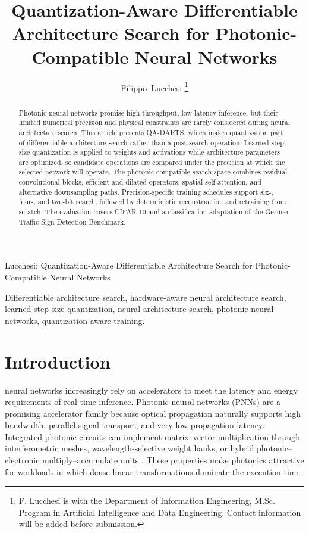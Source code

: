 \documentclass[lettersize,journal]{IEEEtran}
\begin{document}
\title{Quantization-Aware Differentiable Architecture Search for Photonic-Compatible Neural Networks}

\author{Filippo~Lucchesi%
\thanks{F. Lucchesi is with the Department of Information Engineering, M.Sc. Program in Artificial Intelligence and Data Engineering. Contact information will be added before submission.}%
}

%
{Lucchesi: Quantization-Aware Differentiable Architecture Search for Photonic-Compatible Neural Networks}

\maketitle

\begin{abstract}
Photonic neural networks promise high-throughput, low-latency inference, but their limited numerical precision and physical constraints are rarely considered during neural architecture search. This article presents QA-DARTS, which makes quantization part of differentiable architecture search rather than a post-search operation. Learned-step-size quantization is applied to weights and activations while architecture parameters are optimized, so candidate operations are compared under the precision at which the selected network will operate. The photonic-compatible search space combines residual convolutional blocks, efficient and dilated operators, spatial self-attention, and alternative downsampling paths. Precision-specific training schedules support six-, four-, and two-bit search, followed by deterministic reconstruction and retraining from scratch. The evaluation covers CIFAR-10 and a classification adaptation of the German Traffic Sign Detection Benchmark.
\end{abstract}

\begin{IEEEkeywords}
Differentiable architecture search, hardware-aware neural architecture search, learned step size quantization, neural architecture search, photonic neural networks, quantization-aware training.
\end{IEEEkeywords}

\section{Introduction}
 neural networks increasingly rely on accelerators to meet the latency and energy requirements of real-time inference. Photonic neural networks (PNNs) are a promising accelerator family because optical propagation naturally supports high bandwidth, parallel signal transport, and very low propagation latency. Integrated photonic circuits can implement matrix--vector multiplication through interferometric meshes, wavelength-selective weight banks, or hybrid photonic--electronic multiply--accumulate units \cite{demarinis2019survey,shen2017deep}. These properties make photonics attractive for workloads in which dense linear transformations dominate the execution time.
\end{document}
